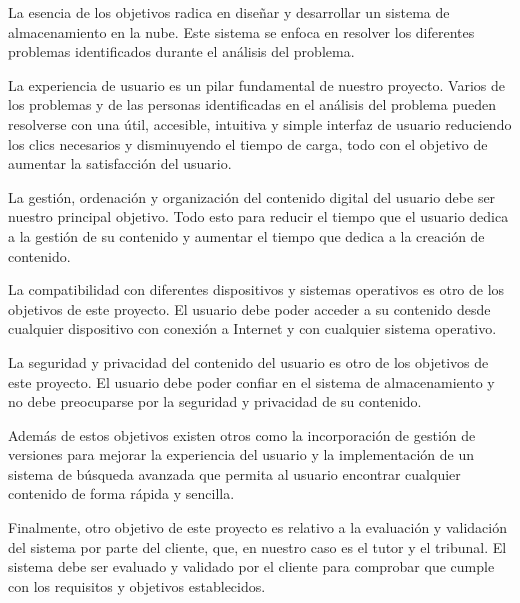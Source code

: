 La esencia de los objetivos radica en diseñar y desarrollar un sistema de almacenamiento en la nube. Este sistema se enfoca en resolver los diferentes problemas
identificados durante el análisis del problema. 

La experiencia de usuario es un pilar fundamental de nuestro proyecto. Varios de los problemas y de las personas identificadas en el análisis del problema
pueden resolverse con una útil, accesible, intuitiva y simple interfaz de usuario reduciendo los clics necesarios y disminuyendo el tiempo de carga,
todo con el objetivo de aumentar la satisfacción del usuario.

La gestión, ordenación y organización del contenido digital del usuario debe ser nuestro principal objetivo. Todo esto para reducir el tiempo que el usuario
dedica a la gestión de su contenido y aumentar el tiempo que dedica a la creación de contenido.

La compatibilidad con diferentes dispositivos y sistemas operativos es otro de los objetivos de este proyecto. El usuario debe poder acceder a su contenido
desde cualquier dispositivo con conexión a Internet y con cualquier sistema operativo.

La seguridad y privacidad del contenido del usuario es otro de los objetivos de este proyecto. El usuario debe poder confiar en el sistema de almacenamiento
y no debe preocuparse por la seguridad y privacidad de su contenido.

Además de estos objetivos existen otros como la incorporación de gestión de versiones para mejorar la experiencia del usuario y la implementación de un sistema
de búsqueda avanzada que permita al usuario encontrar cualquier contenido de forma rápida y sencilla.

Finalmente, otro objetivo de este proyecto es relativo a la evaluación y validación del sistema por parte del cliente, que, en nuestro caso es el tutor
y el tribunal. El sistema debe ser evaluado y validado por el cliente para comprobar que cumple con los requisitos y objetivos establecidos.